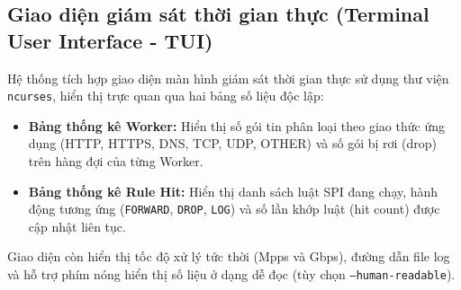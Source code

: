 \documentclass[12pt,a4paper,twoside]{report}
\begin{document}
\subsection{Giao diện giám sát thời gian thực (Terminal User Interface - TUI)}
Hệ thống tích hợp giao diện màn hình giám sát thời gian thực sử dụng thư viện \texttt{ncurses}, hiển thị trực quan qua hai bảng số liệu độc lập:
\begin{itemize}
    \item \textbf{Bảng thống kê Worker:} Hiển thị số gói tin phân loại theo giao thức ứng dụng (HTTP, HTTPS, DNS, TCP, UDP, OTHER) và số gói bị rơi (drop) trên hàng đợi của từng Worker.
    \item \textbf{Bảng thống kê Rule Hit:} Hiển thị danh sách luật SPI đang chạy, hành động tương ứng (\texttt{FORWARD}, \texttt{DROP}, \texttt{LOG}) và số lần khớp luật (hit count) được cập nhật liên tục.
\end{itemize}
Giao diện còn hiển thị tốc độ xử lý tức thời (Mpps và Gbps), đường dẫn file log và hỗ trợ phím nóng hiển thị số liệu ở dạng dễ đọc (tùy chọn \texttt{--}\allowbreak\texttt{human-}\allowbreak\texttt{readable}).
\end{document}
